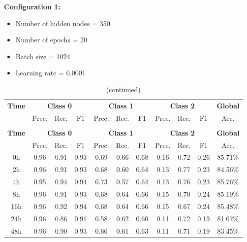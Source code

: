 \documentclass[12pt,oneside]{book} %
\begin{document}
\noindent \textbf{Configuration 1:}
\begin{multicols}{2}
    \begin{itemize}
        \item Number of hidden nodes = 350
        \item Number of epochs = 20
    \end{itemize}
    \begin{itemize}
         \item Batch size = 1024
         \item Learning rate = 0.0001
    \end{itemize}
\end{multicols}

\setlength\LTleft{1cm}
\begin{longtable}{ c ccc ccc ccc c}
\caption{Performance metrics of the LNN model for configuration 1} \\
\toprule
\textbf{Time} & \multicolumn{3}{c}{\textbf{Class 0}} & \multicolumn{3}{c}{\textbf{Class 1}} & \multicolumn{3}{c}{\textbf{Class 2}} & \textbf{Global} \\
               & Prec. & Rec. & F1  & Prec. & Rec. & F1   & Prec. & Rec. & F1  & Acc. \\
\midrule
\endfirsthead

\caption[]{(continued)} \\
\toprule
\textbf{Time} & \multicolumn{3}{c}{\textbf{Class 0}} & \multicolumn{3}{c}{\textbf{Class 1}} & \multicolumn{3}{c}{\textbf{Class 2}} & \textbf{Global} \\
               & Prec. & Rec. & F1  & Prec. & Rec. & F1   & Prec. & Rec. & F1  & Acc. \\
\midrule
\endhead

\bottomrule
\endfoot

\bottomrule
\endlastfoot

0h             & 0.96  & 0.91 & 0.93 & 0.69  & 0.66 & 0.68  & 0.16  & 0.72 & 0.26 & 85.71\% \\
2h             & 0.96  & 0.91 & 0.93 & 0.68  & 0.60 & 0.64  & 0.13  & 0.77 & 0.23 & 84.56\% \\
4h             & 0.95  & 0.94 & 0.94 & 0.73  & 0.57 & 0.64  & 0.13  & 0.76 & 0.23 & 85.76\% \\
8h             & 0.96  & 0.91 & 0.93 & 0.68  & 0.64 & 0.66  & 0.15  & 0.70 & 0.24 & 85.19\% \\
16h            & 0.96  & 0.92 & 0.94 & 0.68  & 0.64 & 0.66  & 0.15  & 0.67 & 0.24 & 85.48\% \\
24h            & 0.96  & 0.86 & 0.91 & 0.58  & 0.62 & 0.60  & 0.11  & 0.72 & 0.19 & 81.07\% \\
48h            & 0.96  & 0.90 & 0.93 & 0.66  & 0.61 & 0.63  & 0.11  & 0.71 & 0.19 & 83.45\% \\
\end{longtable}
\end{document}
